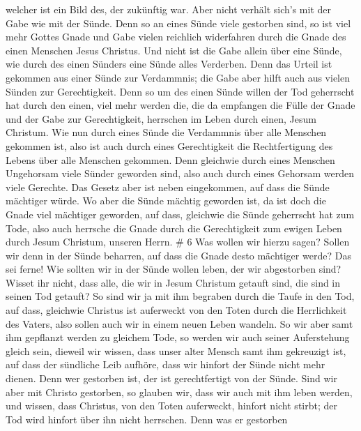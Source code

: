 welcher ist ein Bild des, der zukünftig war.  Aber nicht
verhält sich's mit der Gabe wie mit der Sünde. Denn so an eines Sünde
viele gestorben sind, so ist viel mehr Gottes Gnade und Gabe vielen
reichlich widerfahren durch die Gnade des einen Menschen Jesus Christus.
 Und nicht ist die Gabe allein über eine Sünde, wie durch
des einen Sünders eine Sünde alles Verderben. Denn das Urteil ist
gekommen aus einer Sünde zur Verdammnis; die Gabe aber hilft auch aus
vielen Sünden zur Gerechtigkeit.  Denn so um des einen
Sünde willen der Tod geherrscht hat durch den einen, viel mehr werden
die, die da empfangen die Fülle der Gnade und der Gabe zur
Gerechtigkeit, herrschen im Leben durch einen, Jesum Christum.
 Wie nun durch eines Sünde die Verdammnis über alle
Menschen gekommen ist, also ist auch durch eines Gerechtigkeit die
Rechtfertigung des Lebens über alle Menschen gekommen. 
Denn gleichwie durch eines Menschen Ungehorsam viele Sünder geworden
sind, also auch durch eines Gehorsam werden viele Gerechte.
 Das Gesetz aber ist neben eingekommen, auf dass die Sünde
mächtiger würde. Wo aber die Sünde mächtig geworden ist, da ist doch die
Gnade viel mächtiger geworden,  auf dass, gleichwie die
Sünde geherrscht hat zum Tode, also auch herrsche die Gnade durch die
Gerechtigkeit zum ewigen Leben durch Jesum Christum, unseren Herrn. \# 6
 Was wollen wir hierzu sagen? Sollen wir denn in der Sünde
beharren, auf dass die Gnade desto mächtiger werde?  Das sei
ferne! Wie sollten wir in der Sünde wollen leben, der wir abgestorben
sind?  Wisset ihr nicht, dass alle, die wir in Jesum
Christum getauft sind, die sind in seinen Tod getauft?  So
sind wir ja mit ihm begraben durch die Taufe in den Tod, auf dass,
gleichwie Christus ist auferweckt von den Toten durch die Herrlichkeit
des Vaters, also sollen auch wir in einem neuen Leben wandeln.
 So wir aber samt ihm gepflanzt werden zu gleichem Tode, so
werden wir auch seiner Auferstehung gleich sein,  dieweil
wir wissen, dass unser alter Mensch samt ihm gekreuzigt ist, auf dass
der sündliche Leib aufhöre, dass wir hinfort der Sünde nicht mehr
dienen.  Denn wer gestorben ist, der ist gerechtfertigt von
der Sünde.  Sind wir aber mit Christo gestorben, so glauben
wir, dass wir auch mit ihm leben werden,  und wissen, dass
Christus, von den Toten auferweckt, hinfort nicht stirbt; der Tod wird
hinfort über ihn nicht herrschen.  Denn was er gestorben
